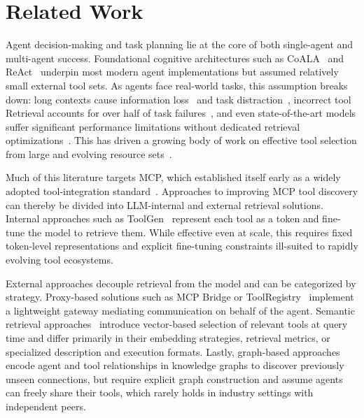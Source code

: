 \section{Related Work}

Agent decision-making and task planning lie at the core of both single-agent and multi-agent success. Foundational cognitive architectures such as CoALA~\cite{sumers2024cognitivearchitectures} and ReAct~\cite{yao2023react} underpin most modern agent implementations but assumed relatively small external tool sets. As agents face real-world tasks, this assumption breaks down: long contexts cause information loss~\cite{liu2023lostmiddlellms} and task distraction~\cite{shi2023llmseasily}, incorrect tool Retrieval accounts for over half of task failures~\cite{mo2026livemcpbench}, and even state-of-the-art models suffer significant performance limitations without dedicated retrieval optimizations~\cite{luo2025mcpuniverse}. This has driven a growing body of work on effective tool selection from large and evolving resource sets~\cite{patil2023gorilla, qin2023toolllm, gaurav2025dynamicreact, wang2025toolgen}.

Much of this literature targets MCP, which established itself early as a widely adopted tool-integration standard~\cite{ehtesham2025surveyagentinteroperabilityprotocols}. Approaches to improving MCP tool discovery can thereby be divided into LLM-internal and external retrieval solutions. Internal approaches such as ToolGen~\cite{wang2025toolgen} represent each tool as a token and fine-tune the model to retrieve them. While effective even at scale, this requires fixed token-level representations and explicit fine-tuning constraints ill-suited to rapidly evolving tool ecosystems.

External approaches decouple retrieval from the model and can be categorized by strategy. Proxy-based solutions such as MCP Bridge or ToolRegistry~\cite{ahmadi2026mcpbridge, ding2025toolregistry} implement a lightweight gateway mediating communication on behalf of the agent. Semantic retrieval approaches~\cite{gaurav2025dynamicreact, gan2025ragmcp, fei2025mcpzero, lumer2025tooltoagent, lumer2025scalemcp, gaurav2025codemem} introduce vector-based selection of relevant tools at query time and differ primarily in their embedding strategies, retrieval metrics, or specialized description and execution formats. Lastly, graph-based approaches~\cite{nizar2025agentasagraph, nie2025llmtoolretrieval} encode agent and tool relationships in knowledge graphs to discover previously unseen connections, but require explicit graph construction and assume agents can freely share their tools, which rarely holds in industry settings with independent peers.

